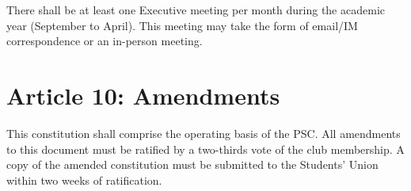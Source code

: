 \documentclass{article}
\begin{document}
There shall be at least one Executive meeting per month during the academic year (September to April). This meeting may take the form of email/IM correspondence or an in-person meeting.

\section{Article 10: Amendments}

This constitution shall comprise the operating basis of the PSC.
All amendments to this document must be ratified by a two-thirds vote of the club membership.  
A copy of the amended constitution must be submitted to the Students' Union within two weeks of ratification.   
\end{document}
